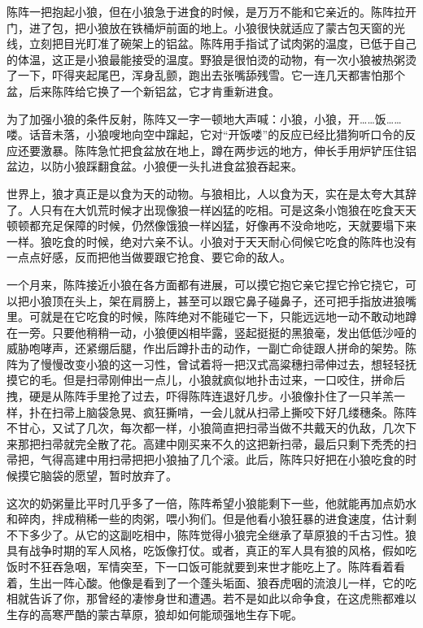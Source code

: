 \par 陈阵一把抱起小狼，但在小狼急于进食的时候，是万万不能和它亲近的。陈阵拉开门，进了包，把小狼放在铁桶炉前面的地上。小狼很快就适应了蒙古包天窗的光线，立刻把目光盯准了碗架上的铝盆。陈阵用手指试了试肉粥的温度，已低于自己的体温，这正是小狼最能接受的温度。野狼是很怕烫的动物，有一次小狼被热粥烫了一下，吓得夹起尾巴，浑身乱颤，跑出去张嘴舔残雪。它一连几天都害怕那个盆，后来陈阵给它换了一个新铝盆，它才肯重新进食。
\par 为了加强小狼的条件反射，陈阵又一字一顿地大声喊：小狼，小狼，开……饭……喽。话音未落，小狼嗖地向空中蹿起，它对“开饭喽”的反应已经比猎狗听口令的反应还要激暴。陈阵急忙把食盆放在地上，蹲在两步远的地方，伸长手用炉铲压住铝盆边，以防小狼踩翻食盆。小狼便一头扎进食盆狼吞起来。
\par 世界上，狼才真正是以食为天的动物。与狼相比，人以食为天，实在是太夸大其辞了。人只有在大饥荒时候才出现像狼一样凶猛的吃相。可是这条小饱狼在吃食天天顿顿都充足保障的时候，仍然像饿狼一样凶猛，好像再不没命地吃，天就要塌下来一样。狼吃食的时候，绝对六亲不认。小狼对于天天耐心伺候它吃食的陈阵也没有一点点好感，反而把他当做要跟它抢食、要它命的敌人。
\par 一个月来，陈阵接近小狼在各方面都有进展，可以摸它抱它亲它捏它拎它挠它，可以把小狼顶在头上，架在肩膀上，甚至可以跟它鼻子碰鼻子，还可把手指放进狼嘴里。可就是在它吃食的时候，陈阵绝对不能碰它一下，只能远远地一动不敢动地蹲在一旁。只要他稍稍一动，小狼便凶相毕露，竖起挺挺的黑狼毫，发出低低沙哑的威胁咆哮声，还紧绷后腿，作出后蹲扑击的动作，一副亡命徒跟人拼命的架势。陈阵为了慢慢改变小狼的这一习性，曾试着将一把汉式高粱穗扫帚伸过去，想轻轻抚摸它的毛。但是扫帚刚伸出一点儿，小狼就疯似地扑击过来，一口咬住，拼命后拽，硬是从陈阵手里抢了过去，吓得陈阵连退好几步。小狼像扑住了一只羊羔一样，扑在扫帚上脑袋急晃、疯狂撕啃，一会儿就从扫帚上撕咬下好几缕穗条。陈阵不甘心，又试了几次，每次都一样，小狼简直把扫帚当做不共戴天的仇敌，几次下来那把扫帚就完全散了花。高建中刚买来不久的这把新扫帚，最后只剩下秃秃的扫帚把，气得高建中用扫帚把把小狼抽了几个滚。此后，陈阵只好把在小狼吃食的时候摸它脑袋的愿望，暂时放弃了。
\par 这次的奶粥量比平时几乎多了一倍，陈阵希望小狼能剩下一些，他就能再加点奶水和碎肉，拌成稍稀一些的肉粥，喂小狗们。但是他看小狼狂暴的进食速度，估计剩不下多少了。从它的这副吃相中，陈阵觉得小狼完全继承了草原狼的千古习性。狼具有战争时期的军人风格，吃饭像打仗。或者，真正的军人具有狼的风格，假如吃饭时不狂吞急咽，军情突至，下一口饭可能就要到来世才能吃上了。陈阵看着看着，生出一阵心酸。他像是看到了一个蓬头垢面、狼吞虎咽的流浪儿一样，它的吃相就告诉了你，那曾经的凄惨身世和遭遇。若不是如此以命争食，在这虎熊都难以生存的高寒严酷的蒙古草原，狼却如何能顽强地生存下呢。
